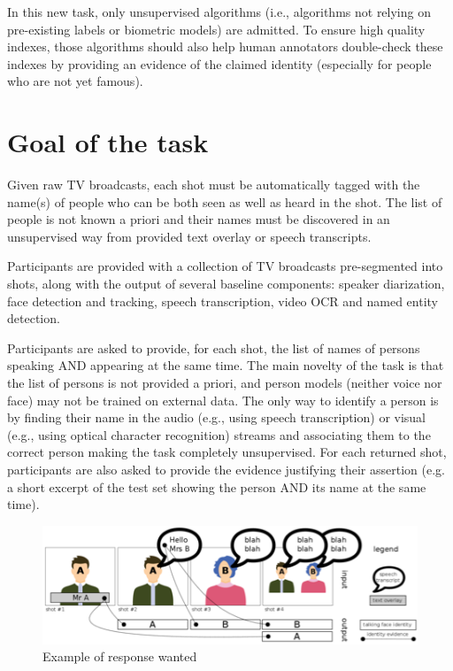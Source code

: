 \documentclass{acm_proc_article-me}
\begin{document}
In this new task, only unsupervised algorithms (i.e., algorithms not relying on pre-existing labels or biometric models) are admitted. To ensure high quality indexes, those algorithms should also help human annotators double-check these indexes by providing an evidence of the claimed identity (especially for people who are not yet famous). 

\section{Goal of the task}

Given raw TV broadcasts, each shot must be automatically tagged with the name(s) of people who can be both seen as well as heard in the shot. The list of people is not known a priori and their names must be discovered in an unsupervised way from provided text overlay or speech transcripts. 

Participants are provided with a collection of TV broadcasts pre-segmented into shots, along with the output of several baseline components: speaker diarization, face detection and tracking, speech transcription, video OCR and named entity detection. 

Participants are asked to provide, for each shot, the list of names of persons speaking AND appearing at the same time. The main novelty of the task is that the list of persons is not provided a priori, and person models (neither voice nor face) may not be trained on external data. The only way to identify a person is by finding their name in the audio (e.g., using speech transcription) or visual (e.g., using optical character recognition) streams and associating them to the correct person making the task completely unsupervised. For each returned shot, participants are also asked to provide the evidence justifying their assertion (e.g. a short excerpt of the test set showing the person AND its name at the same time).

\begin{figure}[htb]
 \center 
 \includegraphics[width=1\linewidth]{figs/evidence.png}
 \centering
 \caption {Example of response wanted}
 \label{fig:evidence}
\end{figure}
\end{document}
